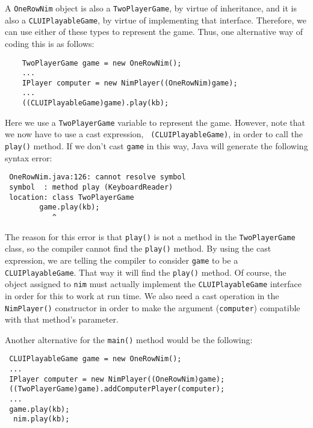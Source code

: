A {\tt OneRowNim} object is also a {\tt TwoPlayerGame}, by virtue of
inheritance, and it is also a {\tt CLUIPlayableGame}, by virtue of
implementing that interface.  Therefore, we can use either of these
types to represent the game.  Thus, one alternative way of coding this
is as follows:

\begin{jjjlisting}
\begin{lstlisting}
    TwoPlayerGame game = new OneRowNim();
    ...
    IPlayer computer = new NimPlayer((OneRowNim)game);
    ...
    ((CLUIPlayableGame)game).play(kb);
\end{lstlisting}
\end{jjjlisting}

\noindent Here we use a {\tt TwoPlayerGame} variable to represent the
game. However, note that we now have to use a cast expression, {\tt
(CLUIPlayableGame)}, in order to call the {\tt play()} method.  If we
don't cast {\tt game} in this way, Java will generate the following
syntax error:

\begin{jjjlisting}
\begin{lstlisting}
 OneRowNim.java:126: cannot resolve symbol
 symbol  : method play (KeyboardReader)
 location: class TwoPlayerGame
        game.play(kb);
           ^
\end{lstlisting}
\end{jjjlisting}

\noindent The reason for this error is that {\tt play()} is not a
method in the {\tt TwoPlayerGame} class, so the compiler cannot find
the {\tt play()} method. By using the cast expression, we are telling
the compiler to consider {\tt game} to be a {\tt
CLUIPlayableGame}. That way it will find the {\tt play()} method. Of
course, the object assigned to {\tt nim} must actually implement the
{\tt CLUIPlayableGame} interface in order for this to work at run
time.  We also need a cast operation in the {\tt NimPlayer()}
constructor in order to make the argument ({\tt computer}) compatible
with that method's parameter.

Another alternative for the {\tt main()} method would be the
following:

\begin{jjjlisting}
\begin{lstlisting}
 CLUIPlayableGame game = new OneRowNim();
 ...
 IPlayer computer = new NimPlayer((OneRowNim)game);
 ((TwoPlayerGame)game).addComputerPlayer(computer);
 ...
 game.play(kb);
  nim.play(kb);
\end{lstlisting}
\end{jjjlisting}

